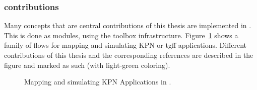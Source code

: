 \subsubsection{contributions}

Many concepts that are central contributions of this thesis are implemented in \mocasin. 
This is done as modules, using the \mocasin toolbox infrastructure. 
Figure~\ref{fig:mocasin_kpn_simulation} shows a family of \mocasin flows for mapping and simulating KPN or \ac{tgff} applications.
Different contributions of this thesis and the corresponding references are described in the figure and marked as such (with light-green coloring).

\begin{figure}[h]
	\centering
   \resizebox{0.95\textwidth}{!}{}
	\caption{Mapping and simulating KPN Applications in \mocasin.}
	\label{fig:mocasin_kpn_simulation}
\end{figure}